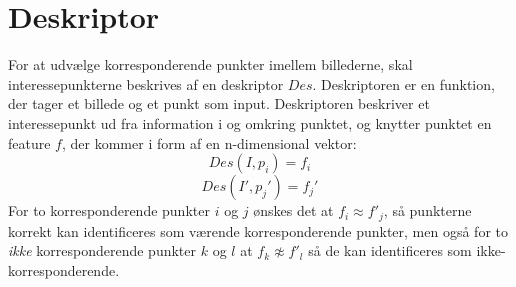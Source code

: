\section{Deskriptor}
For at udvælge korresponderende punkter imellem billederne, skal interessepunkterne beskrives af en deskriptor $Des$. Deskriptoren er en funktion, der tager et billede og et punkt som input. Deskriptoren beskriver et interessepunkt ud fra information i og omkring punktet, og knytter punktet en feature $f$, der kommer i form af en n-dimensional vektor:
\begin{equation}
Des(I,p_i)=f_i
\end{equation}
\begin{equation}
Des(I',p_j')=f_j'
\end{equation}
For to korresponderende punkter $i$ og $j$ ønskes det at $f_i \approx f'_j$, så punkterne korrekt kan identificeres som værende korresponderende punkter, men også for to \textit{ikke} korresponderende punkter $k$ og $l$ at $f_k \not\approx f'_l$ så de kan identificeres som ikke-korresponderende.